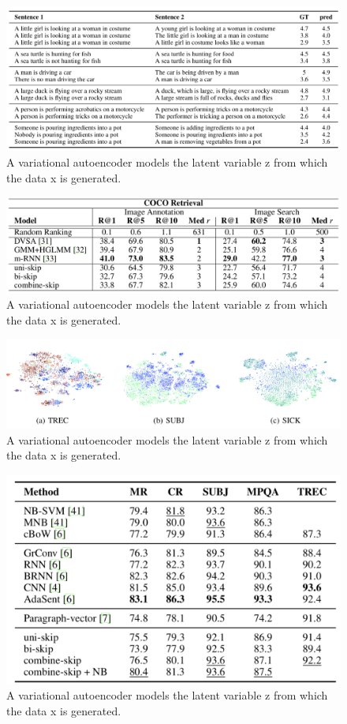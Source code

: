 \begin{figure}
\centering
  \includegraphics[width=.5\linewidth]{files/skipthoughts-5.png}
  \caption{A variational autoencoder models the latent variable z from which the data x is generated.}
  \label{fig:vae}
\end{figure}

\begin{figure}
\centering
  \includegraphics[width=.5\linewidth]{files/skipthoughts-6.png}
  \caption{A variational autoencoder models the latent variable z from which the data x is generated.}
  \label{fig:vae}
\end{figure}

\begin{figure}
\centering
  \includegraphics[width=.5\linewidth]{files/skipthoughts-7.png}
  \caption{A variational autoencoder models the latent variable z from which the data x is generated.}
  \label{fig:vae}
\end{figure}

\begin{figure}
\centering
  \includegraphics[width=.5\linewidth]{files/skipthoughts-8.png}
  \caption{A variational autoencoder models the latent variable z from which the data x is generated.}
  \label{fig:vae}
\end{figure}

